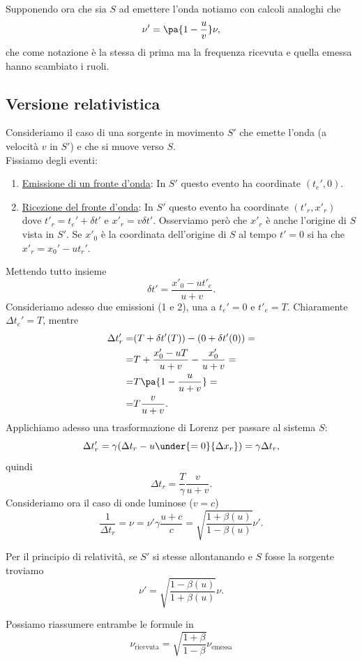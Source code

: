 \noindent Supponendo ora che sia $S$ ad emettere l'onda notiamo con calcoli analoghi che
\[\nu'=\pa{1-\frac uv}\nu,\]
che come notazione \`e la stessa di prima ma la frequenza ricevuta e quella emessa hanno scambiato i ruoli.

\subsection{Versione relativistica}
Consideriamo il caso di una sorgente in movimento $S'$ che emette l'onda (a velocit\`a $v$ in $S'$) e che si muove verso $S$.\\
Fissiamo degli eventi:
\begin{enumerate}
\item \ul{Emissione di un fronte d'onda}: In $S'$ questo evento ha coordinate $(t_e',0)$.
\item \ul{Ricezione del fronte d'onda}: In $S'$ questo evento ha coordinate $(t'_r,x'_r)$ dove $t'_r=t_e'+\delta t'$ e $x'_r=v\delta t'$. Osserviamo per\`o che $x'_r$ \`e anche l'origine di $S$ vista in $S'$. Se $x'_0$ \`e la coordinata dell'origine di $S$ al tempo $t'=0$ si ha che $x'_r=x_0'-ut_r'$.
\end{enumerate}
Mettendo tutto insieme
\[\delta t'=\frac{x'_0-ut'_e}{u+v}.\]
Consideriamo adesso due emissioni (1 e 2), una a $t_e'=0$ e $t'_e=T$. Chiaramente $\Delta t_e'=T$, mentre
\begin{align*}
\Delta t'_r=&(T+\delta t'(T)) - (0+\delta t'(0))=\\
=&T+\frac{x'_0-uT}{u+v}-\frac{x'_0}{u+v}=\\
=&T\pa{1-\frac u{u+v}}=\\
=&T\frac v{u+v}.
\end{align*}
Applichiamo adesso una trasformazione di Lorenz per passare al sistema $S$:
\[\Delta t'_r=\gamma(\Delta t_r-u\under{=0}{\Delta x_r})=\gamma \Delta t_r,\]
quindi
\[\Delta t_r=\frac T\gamma\frac v{u+v}.\]
Consideriamo ora il caso di onde luminose ($v=c$)
\[\frac1{\Delta t_r}=\nu=\nu'\gamma\frac{u+c}c=\sqrt{\frac{1+\beta(u)}{1-\beta(u)}}\nu'.\]
\bigskip

\noindent Per il principio di relativit\`a, se $S'$ si stesse allontanando e $S$ fosse la sorgente troviamo 
\[\nu'=\sqrt{\frac{1-\beta(u)}{1+\beta(u)}}\nu.\]

\bigskip

\noindent Possiamo riassumere entrambe le formule in
\[\boxed{\nu_{\mathrm{ricevuta}}=\sqrt{\frac{1+\beta}{1-\beta}}\nu_{\mathrm{emessa}}}\]




